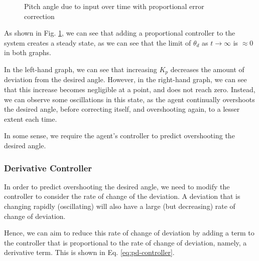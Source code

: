\documentclass[12pt]{article}
\begin{document}
\begin{figure}[H]
\begin{subfigure}{.4\textwidth}
\end{subfigure}
    \caption{Pitch angle due to input over time with proportional error correction}
    \label{fig:pitch-angle2}
    \end{figure}

As shown in Fig. \ref{fig:pitch-angle2}, we can see that adding a proportional controller to the system creates a steady state, as we can see that the limit of $\theta_d$ as $t \to \infty$ is $\approx 0$ in both graphs.

In the left-hand graph, we can see that increasing $K_p$ decreases the amount of deviation from the desired angle. However, in the right-hand graph, we can see that this increase becomes negligible at a point, and does not reach zero. Instead, we can observe some oscillations in this state, as the agent continually overshoots the desired angle, before correcting itself, and overshooting again, to a lesser extent each time.

In some sense, we require the agent's controller to predict overshooting the desired angle.

\subsubsection{Derivative Controller}

In order to predict overshooting the desired angle, we need to modify the controller to consider the rate of change of the deviation. A deviation that is changing rapidly (oscillating) will also have a large (but decreasing) rate of change of deviation.

Hence, we can aim to reduce this rate of change of deviation by adding a term to the controller that is proportional to the rate of change of deviation, namely, a derivative term. This is shown in Eq. \ref{eq:pd-controller}.
\end{document}
